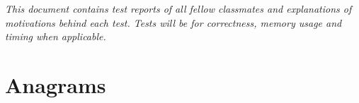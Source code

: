 \documentclass[12pt]{article}
\begin{document}

\newcommand{\hmwkClass}{CSCI 255}
\newcommand{\hmwkSemester}{Spring 2016}

\newcommand{\hmwkAuthorName}{Annamalis \& Lukas}
\newcommand{\hmwkAuthorID}{asharp,lleung}

\newcommand{\hmwkAssignmentNum}{1}

\newcommand{\hmwkProblemNum}{2}

\newcommand{\hmwkCollaborators}{}
\thispagestyle{fancycollab}


\noindent
{\em This document contains test reports of all fellow classmates and explanations
of motivations behind each test. Tests will be for correctness, memory usage and
timing when applicable.}

\section{Anagrams}
\end{document}
